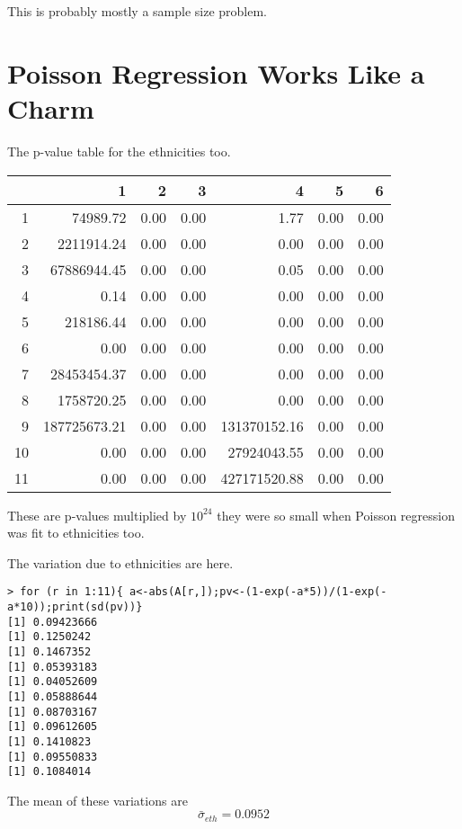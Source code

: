 \documentclass{amsart}
\begin{document}
This is probably mostly a sample size problem.

\section{Poisson Regression Works Like a Charm}

The p-value table for the ethnicities too.

\begin{table}[ht]
\centering
\begin{tabular}{rrrrrrr}
  \hline
 & 1 & 2 & 3 & 4 & 5 & 6 \\ 
  \hline
1 & 74989.72 & 0.00 & 0.00 & 1.77 & 0.00 & 0.00 \\ 
  2 & 2211914.24 & 0.00 & 0.00 & 0.00 & 0.00 & 0.00 \\ 
  3 & 67886944.45 & 0.00 & 0.00 & 0.05 & 0.00 & 0.00 \\ 
  4 & 0.14 & 0.00 & 0.00 & 0.00 & 0.00 & 0.00 \\ 
  5 & 218186.44 & 0.00 & 0.00 & 0.00 & 0.00 & 0.00 \\ 
  6 & 0.00 & 0.00 & 0.00 & 0.00 & 0.00 & 0.00 \\ 
  7 & 28453454.37 & 0.00 & 0.00 & 0.00 & 0.00 & 0.00 \\ 
  8 & 1758720.25 & 0.00 & 0.00 & 0.00 & 0.00 & 0.00 \\ 
  9 & 187725673.21 & 0.00 & 0.00 & 131370152.16 & 0.00 & 0.00 \\ 
  10 & 0.00 & 0.00 & 0.00 & 27924043.55 & 0.00 & 0.00 \\ 
  11 & 0.00 & 0.00 & 0.00 & 427171520.88 & 0.00 & 0.00 \\ 
   \hline
\end{tabular}
\end{table}

These are p-values multiplied by $10^{24}$ they were so small when Poisson regression was fit to ethnicities too.

The variation due to ethnicities are here.

\begin{verbatim}
> for (r in 1:11){ a<-abs(A[r,]);pv<-(1-exp(-a*5))/(1-exp(-a*10));print(sd(pv))}
[1] 0.09423666
[1] 0.1250242
[1] 0.1467352
[1] 0.05393183
[1] 0.04052609
[1] 0.05888644
[1] 0.08703167
[1] 0.09612605
[1] 0.1410823
[1] 0.09550833
[1] 0.1084014
\end{verbatim}

The mean of these variations are 
\[
\bar{\sigma}_{eth} = 0.0952
\]
\end{document}
